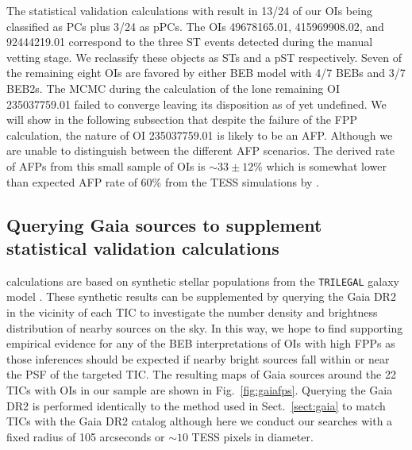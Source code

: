 The statistical validation calculations with \vespa{} result in 13/24 of our
OIs being classified as PCs plus 3/24 as pPCs.
The OIs 49678165.01, 415969908.02, and 92444219.01 correspond to the three
ST events detected during the manual vetting stage. We reclassify these objects as STs and a pST
respectively. Seven of the remaining eight OIs are favored by either BEB
model with 4/7 BEBs and 3/7 BEB2s. The
MCMC during the \vespa{} calculation of the lone remaining OI 235037759.01 failed to converge
leaving its disposition as of yet undefined. We will
show in the following subsection that despite the failure of the FPP calculation, the nature of OI
235037759.01 is likely to be an AFP. Although we are unable to distinguish between the different
AFP scenarios. The derived rate of AFPs from this small sample of OIs is $\sim 33\pm 12$\% which
is somewhat lower than expected AFP rate of 60\% from the TESS simulations by \citep{sullivan15}.


\subsection{Querying Gaia sources to supplement statistical validation calculations} \label{sect:gaiafps}
\vespa{} calculations are based on synthetic stellar populations from the
\texttt{TRILEGAL} galaxy model \citep{girardi05}. These synthetic results can be supplemented
by querying the Gaia DR2 in the vicinity of each TIC to investigate the number density and brightness
distribution of nearby sources on the sky. In this way, we hope to find supporting empirical evidence for
any of the BEB interpretations of OIs with high FPPs as those inferences should be expected if nearby bright
sources fall within or near the PSF of the targeted TIC. The resulting maps of Gaia sources around
the 22 TICs with OIs in our sample are shown in Fig.~\ref{fig:gaiafps}. Querying the Gaia DR2 is
performed identically to the method used in Sect.~\ref{sect:gaia} to match TICs with the Gaia DR2 catalog
although here we conduct our searches with a fixed radius of 105 arcseconds or $\sim 10$ TESS pixels
in diameter. \\

